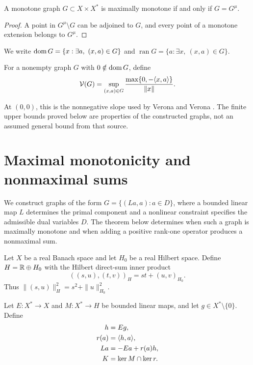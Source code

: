\begin{proposition}
A monotone graph $G\subset X\times X^*$ is maximally monotone
if and only if $G=G^\mu$.
\end{proposition}
\begin{proof}
A point in $G^\mu\setminus G$ can be adjoined to $G$, and every
point of a monotone extension belongs to $G^\mu$.
\end{proof}

We write
$\operatorname{dom} G=\{x:\exists a,\ (x,a)\in G\}$ and
$\operatorname{ran}G=\{a:\exists x,\ (x,a)\in G\}$.


\begin{definition}
For a nonempty graph $G$ with $0\notin\operatorname{dom} G$, define
\begin{equation}
\mathcal V(G)=\sup_{(x,a)\in G}
 \frac{\max\{0,-\langle x,a\rangle\}}{\|x\|}.
\label{eq:D3}
\end{equation}
\end{definition}
At $(0,0)$, this is the nonnegative slope used by Verona and Verona
\cite{verona2008}. The finite upper bounds proved below are properties
of the constructed graphs, not an assumed general bound from that source.

\section{Maximal monotonicity and nonmaximal sums}
\label{sec:endpoint-criterion}
We construct graphs of the form $G=\{(La,a):a\in D\}$, where a bounded
linear map $L$ determines the primal component and a nonlinear constraint
specifies the admissible dual variables $D$. The theorem below determines
when such a graph is maximally monotone and when adding a positive
rank-one operator produces a nonmaximal sum.

Let $X$ be a real Banach space and let $H_0$ be a real Hilbert space.
Define $H=\mathbb R\oplus H_0$ with the Hilbert direct-sum inner product
\[
((s,u),(t,v))_H=st+(u,v)_{H_0}.
\]
Thus $\|(s,u)\|_H^2=s^2+\|u\|_{H_0}^2$.

\begin{definition}
\label{def:construction-maps}
Let $E:X^*\to X$ and $M:X^*\to H$ be bounded linear maps, and let
$g\in X^*\setminus\{0\}$. Define
\[
\begin{aligned}
h&=Eg,\\
r(a)&=\langle h,a\rangle,\\
La&=-Ea+r(a)h,\\
K&=\ker M\cap\ker r.
\end{aligned}
\]
\end{definition}

